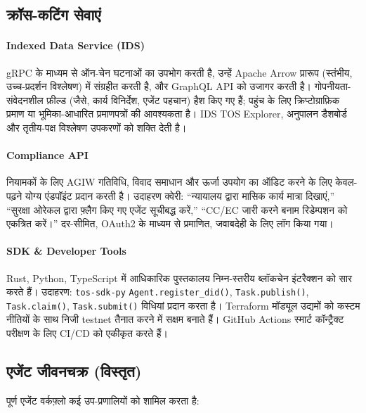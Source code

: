 \documentclass[11pt]{article}
\begin{document}
\subsection{क्रॉस-कटिंग सेवाएं}
\paragraph{Indexed Data Service (IDS)} gRPC के माध्यम से ऑन-चेन घटनाओं का उपभोग करती है, उन्हें Apache Arrow प्रारूप (स्तंभीय, उच्च-प्रदर्शन विश्लेषण) में संग्रहीत करती है, और GraphQL API को उजागर करती है। गोपनीयता-संवेदनशील फ़ील्ड (जैसे, कार्य विनिर्देश, एजेंट पहचान) हैश किए गए हैं; पहुंच के लिए क्रिप्टोग्राफ़िक प्रमाण या भूमिका-आधारित प्रमाणपत्रों की आवश्यकता है। IDS TOS Explorer, अनुपालन डैशबोर्ड और तृतीय-पक्ष विश्लेषण उपकरणों को शक्ति देती है।

\paragraph{Compliance API} नियामकों के लिए AGIW गतिविधि, विवाद समाधान और ऊर्जा उपयोग का ऑडिट करने के लिए केवल-पढ़ने योग्य एंडपॉइंट प्रदान करती है। उदाहरण क्वेरी: ``न्यायालय द्वारा मासिक कार्य मात्रा दिखाएं,'' ``सुरक्षा ओरेकल द्वारा फ़्लैग किए गए एजेंट सूचीबद्ध करें,'' ``CC/EC जारी करने बनाम रिडेम्पशन को एकत्रित करें।'' दर-सीमित, OAuth2 के माध्यम से प्रमाणित, जवाबदेही के लिए लॉग किया गया।

\paragraph{SDK \& Developer Tools} Rust, Python, TypeScript में आधिकारिक पुस्तकालय निम्न-स्तरीय ब्लॉकचेन इंटरैक्शन को सार करते हैं। उदाहरण: \texttt{tos-sdk-py} \texttt{Agent.register\_did()}, \texttt{Task.publish()}, \texttt{Task.claim()}, \texttt{Task.submit()} विधियां प्रदान करता है। Terraform मॉड्यूल उद्यमों को कस्टम नीतियों के साथ निजी testnet तैनात करने में सक्षम बनाते हैं। GitHub Actions स्मार्ट कॉन्ट्रैक्ट परीक्षण के लिए CI/CD को एकीकृत करते हैं।

\subsection{एजेंट जीवनचक्र (विस्तृत)}
पूर्ण एजेंट वर्कफ़्लो कई उप-प्रणालियों को शामिल करता है:
\end{document}

